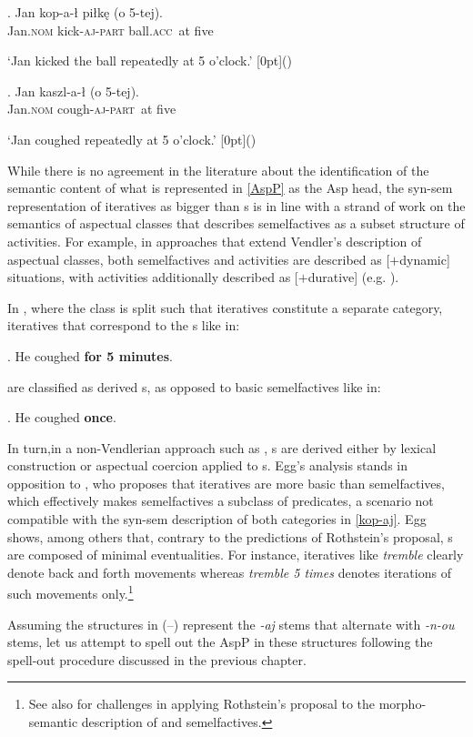 \exg. Jan kop-{a}-\l {} pi\l k\k{e} ({o 5-tej)}. \\
	Jan.\textsc{nom} kick-\textsc{aj-part} ball.\textsc{acc} { \,at five}\\
	\strut `Jan kicked the ball repeatedly at 5 o'clock.' \hfill\raisebox{2.075\baselineskip}[0pt]{()}
	
\exg.	Jan kaszl-a-\l  {} ({o 5-tej)}.  \\
	Jan.\textsc{nom} cough-\textsc{aj-part} { \,at five}\\
	\strut `Jan coughed repeatedly at 5 o'clock.' \hfill\raisebox{2.075\baselineskip}[0pt]{()}

\noindent
While there is no agreement in the literature about the identification of the semantic content of what is represented in \ref{AspP} as the Asp head, the syn-sem representation of iteratives as bigger than s is in line with a strand of work on the semantics of aspectual classes that describes semelfactives as a subset structure of  activities. For example, in approaches that extend Vendler's \citeyearpar{Vendler1967} description of aspectual classes, both semelfactives and activities are described as [$+$dynamic] situations, with activities additionally described as [$+$durative] (e.g. \citealt{Smith1997,Olsen1994,Olsen1997,Beavers2008}). 
\par
In \cite{XM2004}, where the  class is split such that iteratives constitute a separate category, iteratives that correspond to the  s like in:

\ex. He coughed \textbf{for 5 minutes}.

are classified as derived s, as opposed to basic semelfactives like in:

\ex. He coughed \textbf{once}.

In turn,\largerpage in a non-Vendlerian approach such as \cite{Egg2017}, s are derived either by lexical construction or aspectual coercion applied to s. Egg's \citeyearpar{Egg2017} analysis stands in opposition to \cite{rothstein2004}, who proposes that iteratives are more basic than semelfactives, which effectively makes semelfactives a subclass of  predicates, a scenario not compatible with the syn-sem description of both categories in \ref{kop-aj}. Egg shows, among others that, contrary to the predictions of Rothstein's proposal, s are composed of minimal eventualities. For instance, iteratives like \textit{tremble} clearly denote back and forth movements whereas \textit{tremble 5 times} denotes iterations of such movements only.\footnote{See also \citet[\S4.1]{NU} for challenges in applying Rothstein's proposal to the morpho-semantic description of  and  semelfactives.
}%
\par Assuming the structures in (--) represent the  \textit{-aj} stems that alternate with \textit{-n-ou} stems, let us attempt to spell out the AspP in these structures following the spell-out procedure discussed in the previous chapter.

